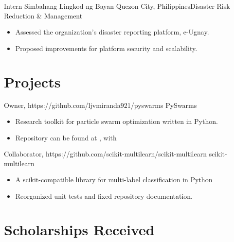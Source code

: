 \documentclass[11pt,a4paper,sans]{moderncv}
\begin{document}
        {Intern}
        {Simbahang Lingkod ng Bayan}
        {Quezon City, Philippines}{Disaster Risk Reduction \& Management}
        {
            \begin{itemize}
                \item Assessed the organization's disaster reporting platform, e-Ugnay.
                \item Proposed improvements for platform security and scalability.
            \end{itemize}
        }


\section{Projects}

        {Owner, https://github.com/ljvmiranda921/pyswarms}
        {PySwarms}{}{}
        {
            \begin{itemize}
                \item Research toolkit for particle swarm optimization written in Python.
                \item Repository can be found at {\color{blue} }, with {\color{blue}}
            \end{itemize}
        }

        {Collaborator, https://github.com/scikit-multilearn/scikit-multilearn}
        {scikit-multilearn}{}{}
        {
            \begin{itemize}
                \item A scikit-compatible library for multi-label classification in Python
                \item Reorganized unit tests and fixed repository documentation.
            \end{itemize}
        }

\section{Scholarships Received}
\nocite{*}


\end{document}
